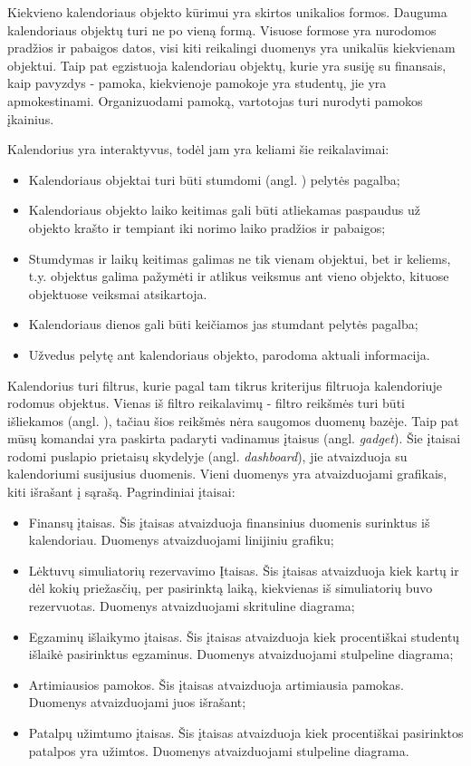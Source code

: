 \documentclass{VUMIFPSbakalaurinis}
\begin{document}
Kiekvieno kalendoriaus objekto kūrimui yra skirtos unikalios formos. Dauguma kalendoriaus objektų turi ne po vieną formą. Visuose formose yra nurodomos pradžios ir pabaigos datos, visi kiti reikalingi duomenys yra unikalūs kiekvienam objektui. Taip pat egzistuoja kalendoriau objektų, kurie yra susiję su finansais, kaip pavyzdys - pamoka, kiekvienoje pamokoje yra studentų, jie yra apmokestinami. Organizuodami pamoką, vartotojas turi nurodyti pamokos įkainius.

Kalendorius yra interaktyvus, todėl jam yra keliami šie reikalavimai: 
\begin{itemize}
    \item Kalendoriaus objektai turi būti stumdomi (angl. ) pelytės pagalba;
    \item Kalendoriaus objekto laiko keitimas gali būti atliekamas paspaudus už objekto krašto ir tempiant iki norimo laiko pradžios ir pabaigos;
    \item Stumdymas ir laikų keitimas galimas ne tik vienam objektui, bet ir keliems, t.y. objektus galima pažymėti ir atlikus veiksmus ant vieno objekto, kituose objektuose veiksmai atsikartoja.
    \item Kalendoriaus dienos gali būti keičiamos jas stumdant pelytės pagalba;
    \item Užvedus pelytę ant kalendoriaus objekto, parodoma aktuali informacija.
\end{itemize}

Kalendorius turi filtrus, kurie pagal tam tikrus kriterijus filtruoja kalendoriuje rodomus objektus. Vienas iš filtro reikalavimų - filtro reikšmės turi būti išliekamos (angl. ), tačiau šios reikšmės nėra saugomos duomenų bazėje. Taip pat mūsų komandai yra paskirta padaryti vadinamus įtaisus (angl. \textit{gadget}). Šie įtaisai rodomi puslapio prietaisų skydelyje (angl. \textit{dashboard}), jie atvaizduoja su kalendoriumi susijusius duomenis. Vieni duomenys yra atvaizduojami grafikais, kiti išrašant į sąrašą. Pagrindiniai įtaisai:
\begin{itemize}
    \item Finansų įtaisas. Šis įtaisas atvaizduoja finansinius duomenis surinktus iš kalendoriau. Duomenys atvaizduojami linijiniu grafiku;
    \item Lėktuvų simuliatorių rezervavimo Įtaisas. Šis įtaisas atvaizduoja kiek kartų ir dėl kokių priežasčių, per pasirinktą laiką, kiekvienas iš simuliatorių buvo rezervuotas. Duomenys atvaizduojami skrituline diagrama;
    \item Egzaminų išlaikymo įtaisas. Šis įtaisas atvaizduoja kiek procentiškai studentų išlaikė pasirinktus egzaminus. Duomenys atvaizduojami stulpeline diagrama;
    \item Artimiausios pamokos. Šis įtaisas atvaizduoja artimiausia pamokas. Duomenys atvaizduojami juos išrašant;
    \item Patalpų užimtumo įtaisas. Šis įtaisas atvaizduoja kiek procentiškai pasirinktos patalpos yra užimtos. Duomenys atvaizduojami stulpeline diagrama.
\end{itemize}
\end{document}
